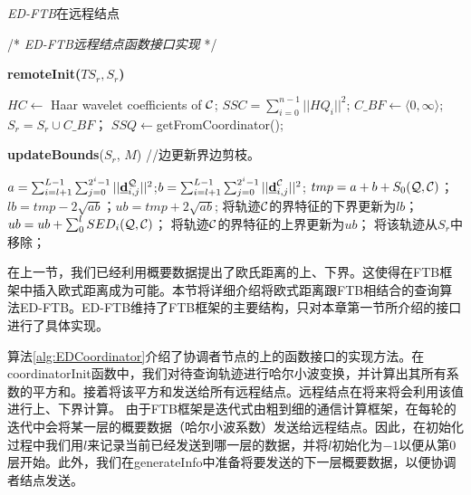 \begin{algorithm}[t]
	\renewcommand{\baselinestretch}{1}
	\caption{{\sl ED-FTB}\label{alg:EDRemote}在远程结点}
	\begin{algorithmic}[2]
		\STATE /* \emph{ED-FTB远程结点函数接口实现} */
	\end{algorithmic}
	
	\textbf{remoteInit($TS_{r} , S_{r}$)}
	\begin{algorithmic}[1]
		\STATE $HC \leftarrow$ Haar wavelet coefficients of $\cal C$; 
		\STATE $SSC = \sum_{i=0}^{n-1}||HQ_{i}||^2$;	   
		\ENDFOR
		\ENDIF
		\STATE $C\_BF \leftarrow  \langle 0,\infty \rangle$; 
		\STATE $S_{r}=S_{r} \cup C\_BF$；
		\ENDFOR
		\STATE $SSQ \leftarrow$\textsf{getFromCoordinator}();
	\end{algorithmic}
	
	\textbf{updateBounds}($S_{r}$, $M$) //边更新界边剪枝。
	\begin{algorithmic}[1]
		\STATE  $a=\sum_{i=l+1}^{L-1}\sum_{j=0}^{2^i-1}||\emph{{\textbf{d}}}_{i,j}^{\cal Q}||^2$;$b=\sum_{i=l+1}^{L-1}\sum_{j=0}^{2^i-1}||\emph{{\textbf{d}}}_{i,j}^{\cal C}||^2$;
		\STATE $tmp=a+b+S_{0}(\cal Q, \cal C)$；
		\STATE $lb=tmp -2\sqrt{ab}$；$ub=tmp+2\sqrt{ab}$;
		\STATE 将轨迹$\cal C$的界特征的下界更新为$lb$；
		\STATE $ ub=ub+ \sum_{0}^{l}SED_{i}({\cal Q}, {\cal C})$；
		\STATE 将轨迹$\cal C$的界特征的上界更新为$ub$；
		\ENDIF
		\ELSE
		\STATE 将该轨迹从$S_{r}$中移除；
		\ENDIF
		\ENDFOR
	\end{algorithmic}
\end{algorithm}

在上一节，我们已经利用概要数据提出了欧氏距离的上、下界。这使得在FTB框架中插入欧式距离成为可能。本节将详细介绍将欧式距离跟FTB相结合的查询算法ED-FTB。ED-FTB维持了FTB框架的主要结构，只对本章第一节所介绍的接口进行了具体实现。

算法\ref{alg:EDCoordinator}介绍了协调者节点的上的函数接口的实现方法。在\textsf{coordinatorInit}函数中，我们对待查询轨迹进行哈尔小波变换，并计算出其所有系数的平方和。接着将该平方和发送给所有远程结点。远程结点在将来将会利用该值进行上、下界计算。
由于FTB框架是迭代式由粗到细的通信计算框架，在每轮的迭代中会将某一层的概要数据（哈尔小波系数）发送给远程结点。因此，在初始化过程中我们用$l$来记录当前已经发送到哪一层的数据，并将$l$初始化为$-1$以便从第0层开始。此外，我们在\textsf{generateInfo}中准备将要发送的下一层概要数据，以便协调者结点发送。

